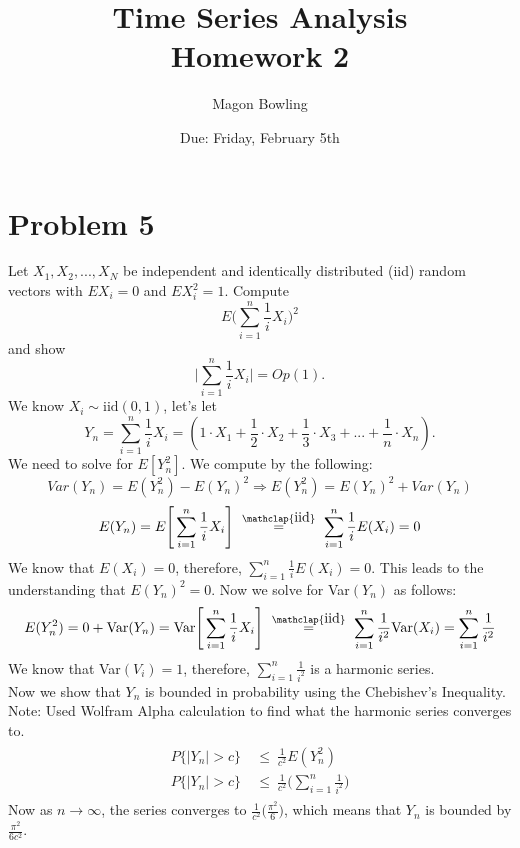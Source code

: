 \documentclass[11pt]{article}
\theoremstyle{definition}
\newcommand{\1}[1]{\mathbf{1} \left \{ #1 \right \}}
\newcommand\myeq{\stackrel{\mathclap{\normalfont\mbox{iid}}}{=}}
\begin{document}
\title{Time Series Analysis \\ Homework 2}
\date{Due: Friday, February 5th}
\author{Magon Bowling}

\maketitle

\section{{\color{red} \textbf{Problem 5}}}
\item Let $X_1, X_2, ..., X_N$ be independent and identically distributed (iid) random vectors with $EX_i = 0$ and $EX_i^2 = 1$.  Compute
\[E\Bigg(\sum_{i=1}^n \frac{1}{i} X_i\Bigg)^2\]
and show
\[\Bigg|\sum_{i=1}^n \frac{1}{i} X_i\Bigg| = Op(1).\]
We know $X_i \sim \text{iid} (0,1)$, let's let
\[Y_n = \sum_{i=1}^n \frac{1}{i} X_i = (1\cdot X_1 + \frac{1}{2}\cdot X_2 + \frac{1}{3}\cdot X_3 + ... + \frac{1}{n}\cdot X_n). \]
We need to solve for $E[Y_n^2]$.  We compute by the following:
\[Var(Y_n) = E(Y_n^2) - E(Y_n)^2 \Rightarrow E(Y_n^2) = E(Y_n)^2 + Var(Y_n)\]
\[E(Y_n) = E\Bigg[\sum_{i=1}^n \frac{1}{i} X_i\Bigg] \ \myeq \ \sum_{i=1}^n \frac{1}{i} E(X_i) = 0\]
We know that $E(X_i) = 0$, therefore, \(\sum_{i=1}^n \frac{1}{i} E(X_i) = 0\).  This leads to the understanding that $E(Y_n)^2 = 0$.  Now we solve for Var$(Y_n)$ as follows:
\[E(Y_n^2) = 0 + \text{Var}(Y_n) = \text{Var}\Bigg[\sum_{i=1}^n \frac{1}{i} X_i\Bigg] \ \myeq \ \sum_{i=1}^n \frac{1}{i^2} \text{Var}(X_i) = \sum_{i=1}^n \frac{1}{i^2}\]
We know that Var$(V_i) = 1$, therefore, \(\sum_{i=1}^n \frac{1}{i^2}\) is a harmonic series.  \\
Now we show that $Y_n$ is bounded in probability using the Chebishev's Inequality.  Note: Used Wolfram Alpha calculation to find what the harmonic series converges to.
\begin{align*}
    \begin{split}
        P\{|Y_n| > c\} \ &\leq \ \frac{1}{c^2} E(Y_n^2) \\
        P\{|Y_n| > c\} \ &\leq \ \frac{1}{c^2} \Bigg(\sum_{i=1}^n \frac{1}{i^2}\Bigg)
    \end{split}
\end{align*}
Now as $n \rightarrow \infty$, the series converges to $\frac{1}{c^2}\Big(\frac{\pi^2}{6}\Big)$, which means that $Y_n$ is bounded by $\frac{\pi^2}{6c^2}$.
\end{document}
